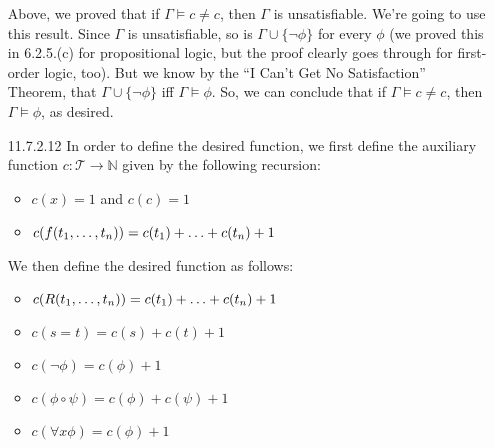 \begin{itemize}
                              Above, we proved that if $\Gamma\vDash
                              c\neq c$, then $\Gamma$ is
                              unsatisfiable. We're going to use this
                              result. Since $\Gamma$ is unsatisfiable,
                              so is $\Gamma\cup\{\neg\phi\}$ for every
                              $\phi$ (we proved this in 6.2.5.(c) for
                              propositional logic, but the proof
                              clearly goes through for first-order
                              logic, too). But we know by the ``I
                              Can't Get No Satisfaction'' Theorem,
                              that $\Gamma\cup\{\neg\phi\}$ iff
                              $\Gamma\vDash\phi$. So, we can conclude
                              that if $\Gamma\vDash
                              c\neq c$, then $\Gamma\vDash\phi$, as
                              desired.

                              \item[11.7.2.12] In order to define the
                                desired function, we first define the
                                auxiliary function
                                $c:\mathcal{T}\to\mathbb{N}$ given by
                                the following recursion:
                                \begin{itemize}
                                \item $c(x)=1$ and $c(c)=1$
                                \item $c(f(t_1, \mathellipsis, t_n))=c(t_1)+\mathellipsis+c(t_n)+1$
                                \end{itemize}
                               We then define the desired function as
                               follows:
                               \begin{itemize}
                               \item $c(R(t_1, \mathellipsis,
                                 t_n))=c(t_1)+\mathellipsis+c(t_n)+1$

                               \item $c(s=t)=c(s)+c(t)+1$

                               \item $c(\neg \phi)=c(\phi)+1$
                               \item
                                 $c(\phi\circ\psi)=c(\phi)+c(\psi)+1$
                               \item $c(\forall x\phi)=c(\phi)+1$
                               \end{itemize}


\end{itemize}
